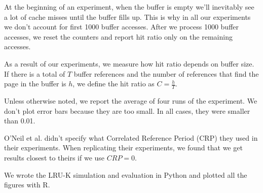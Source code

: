 At the beginning of an experiment, when the buffer is empty we'll inevitably see a lot of cache misses until the buffer fills up. This is why in all our experiments we don't account for first 1000 buffer accesses. After we process 1000 buffer accesses, we reset the counters and report hit ratio only on the remaining accesses.

As a result of our experiments, we measure how hit ratio depends on buffer size. If there is a total of $T$ buffer references and the number of references that find the page in the buffer is $h$, we define the hit ratio as $C = \frac{h}{T}$.

Unless otherwise noted, we report the average of four runs of the experiment. We don't plot error bars because they are too small. In all cases, they were smaller than 0.01.

O'Neil et al. \cite{lruk} didn't specify what Correlated Reference Period (CRP) they used in their experiments. When replicating their experiments, we found that we get results closest to theirs if we use $CRP = 0$.

We wrote the LRU-K simulation and evaluation in Python and plotted all the figures with R.